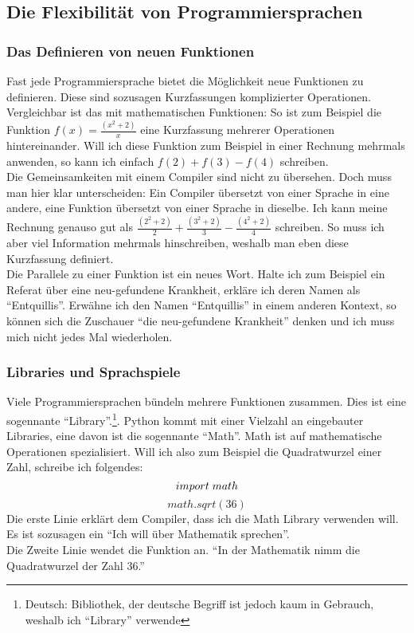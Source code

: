 \documentclass[a4paper,10pt]{article}
\begin{document}
\subsection{Die Flexibilität von Programmiersprachen}
\subsubsection{Das Definieren von neuen Funktionen}
Fast jede Programmiersprache bietet die Möglichkeit neue Funktionen zu definieren. Diese sind sozusagen Kurzfassungen komplizierter Operationen. Vergleichbar ist das mit mathematischen Funktionen: So ist zum Beispiel die Funktion $f(x) = \frac{(x^2 + 2)}{x}$ eine Kurzfassung mehrerer Operationen hintereinander. Will ich diese Funktion zum Beispiel in einer Rechnung mehrmals anwenden, so kann ich einfach $f(2) + f(3) - f(4)$ schreiben. \\
Die Gemeinsamkeiten mit einem Compiler sind nicht zu übersehen. Doch muss man hier klar unterscheiden: Ein Compiler übersetzt von einer Sprache in eine andere, eine Funktion übersetzt von einer Sprache in dieselbe. Ich kann meine Rechnung genauso gut als $\frac{(2^2 + 2)}{2} + \frac{(3^2 + 2)}{3} - \frac{(4^2 + 2)}{4}$ schreiben. So muss ich aber viel Information mehrmals hinschreiben, weshalb man eben diese Kurzfassung definiert. \\
Die Parallele zu einer Funktion ist ein neues Wort. Halte ich zum Beispiel ein Referat über eine neu-gefundene Krankheit, erkläre ich deren Namen als \enquote{Entquillis}. Erwähne ich den Namen \enquote{Entquillis} in einem anderen Kontext, so können sich die Zuschauer \enquote{die neu-gefundene Krankheit} denken und ich muss mich nicht jedes Mal wiederholen. \\

\subsubsection{Libraries und Sprachspiele}
Viele Programmiersprachen bündeln mehrere Funktionen zusammen. Dies ist eine sogennante \enquote{Library}.\footnote{Deutsch: Bibliothek, der deutsche Begriff ist jedoch kaum in Gebrauch, weshalb ich \enquote{Library} verwende}. Python kommt mit einer Vielzahl an eingebauter Libraries, eine davon ist die sogennante \enquote{Math}. Math ist auf mathematische Operationen spezialisiert. Will ich also zum Beispiel die Quadratwurzel einer Zahl, schreibe ich folgendes:
$$import \hspace{1mm} math$$
$$math.sqrt(36)$$
Die erste Linie erklärt dem Compiler, dass ich die Math Library verwenden will. Es ist sozusagen ein \enquote{Ich will über Mathematik sprechen}. \\
Die Zweite Linie wendet die Funktion an. \enquote{In der Mathematik nimm die Quadratwurzel der Zahl 36.} \\
\end{document}
